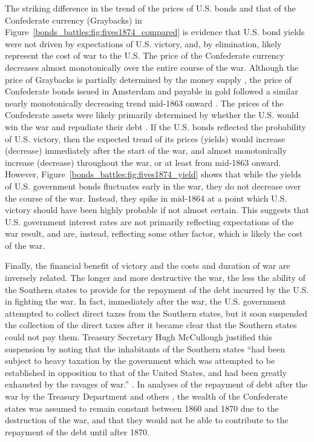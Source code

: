 The striking difference in the trend of the prices of U.S. bonds and that of the Confederate currency (Graybacks) in Figure~\ref{bonds_battles:fig:fives1874_compared} is evidence that U.S. bond yields were not driven by expectations of U.S. victory, and, by elimination, likely represent the cost of war to the U.S.
The price of the Confederate currency decreases almost monotonically over the entire course of the war.
Although the price of Graybacks is partially determined by the money supply \parencite{BurdekinWeidenmier2001}, the price of Confederate bonds issued in Amsterdam and payable in gold followed a similar nearly monotonically decreasing trend mid-1863 onward \parencite{HaberMitchenerOosterlinckEtAl2015}.
The prices of the Confederate assets were likely primarily determined by whether the U.S. would win the war and repudiate their debt \parencite{HaberMitchenerOosterlinckEtAl2015}.
If the U.S. bonds reflected the probability of U.S. victory, then the expected trend of its prices (yields) would increase (decrease) immediately after the start of the war, and almost monotonically increase (decrease) throughout the war, or at least from mid-1863 onward.
However, Figure~\ref{bonds_battles:fig:fives1874_yield} shows that while the yields of U.S. government bonds fluctuates early in the war, they do not decrease over the course of the war.
Instead, they spike in mid-1864 at a point which U.S. victory should have been highly probable if not almost certain. 
This suggests that U.S. government interest rates are not primarily reflecting expectations of the war result, and are, instead, reflecting some other factor, which is likely the cost of the war.

Finally, the financial benefit of victory and the costs and duration of war are inversely related.
The longer and more destructive the war, the less the ability of the Southern states to provide for the repayment of the debt incurred by the U.S. in fighting the war.
In fact, immediately after the war, the U.S. government attempted to collect direct taxes from the Southern states, but it soon suspended the collection of the direct taxes after it became clear that the Southern states could not pay them.
Treasury Secretary Hugh McCullough justified this suspension by noting that the inhabitants of the Southern states ``had been subject to heavy taxation by the government which was attempted to be established in opposition to that of the United States, and had been greatly exhausted by the ravages of war.'' \parencite[29]{Treasury1865}.
In analyses of the repayment of debt after the war by the Treasury Department and others \parencites{Elder1865}{Treasury1865}{Walker1865a}, the wealth of the Confederate states was assumed to remain constant between 1860 and 1870 due to the destruction of the war, and that they would not be able to contribute to the repayment of the debt until after 1870.

